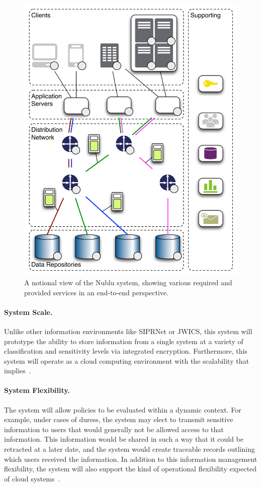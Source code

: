 \documentclass[12pt,letterpaper]{article}
\begin{document}
\begin{figure}
\begin{center}
\includegraphics[width=.47\textwidth]{./images/network.pdf}
\end{center}
\caption{A notional view of the Nublu system, showing various required and provided services in an end-to-end perspective.}
\label{fig:network}
\end{figure}

\paragraph{System Scale.} Unlike other information environments like SIPRNet or JWICS, this system will prototype the ability to store information from a single system at a variety of classification and sensitivity levels via integrated encryption.  Furthermore, this system will operate as a cloud computing environment with the scalability that implies~.

\paragraph{System Flexibility.} The system will allow policies to be evaluated within a dynamic context.  For example, under cases of duress, the system may elect to transmit sensitive information to users that would generally not be allowed access to that information.  This information would be shared in such a way that it could be retracted at a later date, and the system would create traceable records outlining which users received the information.  In addition to this information management flexibility, the system will also support the kind of operational flexibility expected of cloud systems~.
\end{document}
